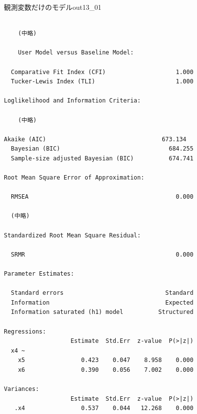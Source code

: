 \begin{Rscreen}{観測変数だけのモデル}{out13_01}
	\begin{verbatim}

    (中略)

    User Model versus Baseline Model:

  Comparative Fit Index (CFI)                    1.000
  Tucker-Lewis Index (TLI)                       1.000

Loglikelihood and Information Criteria:

    (中略)

Akaike (AIC)                                 673.134
  Bayesian (BIC)                               684.255
  Sample-size adjusted Bayesian (BIC)          674.741

Root Mean Square Error of Approximation:

  RMSEA                                          0.000

  (中略)

Standardized Root Mean Square Residual:

  SRMR                                           0.000

Parameter Estimates:

  Standard errors                             Standard
  Information                                 Expected
  Information saturated (h1) model          Structured

Regressions:
                   Estimate  Std.Err  z-value  P(>|z|)
  x4 ~                                                
    x5                0.423    0.047    8.958    0.000
    x6                0.390    0.056    7.002    0.000

Variances:
                   Estimate  Std.Err  z-value  P(>|z|)
   .x4                0.537    0.044   12.268    0.000
\end{verbatim}
\end{Rscreen}

